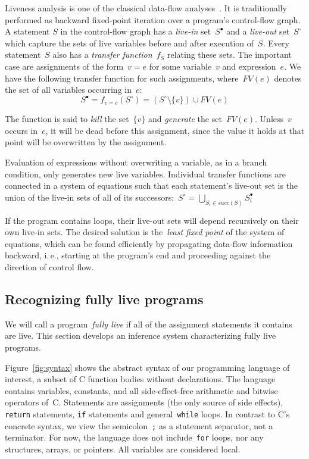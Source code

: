 \documentclass{llncs}
\newcommand{\liveout}[1]{\ensuremath{#1^{\circ}}}
\newcommand{\livein}[1]{\ensuremath{#1^{\bullet}}}
\def\union{\cup}
\begin{document}
Liveness analysis is one of the classical data-flow
analyses~\cite{nielson.etal-1999}. It is traditionally performed as backward
fixed-point iteration over a program's control-flow graph. A statement \(S\)
in the control-flow graph has a \emph{live-in} set~\(\livein{S}\) and a
\emph{live-out} set~\(\liveout{S}\) which capture the sets of live variables
before and after execution of~\(S\). Every statement~\(S\) also has a
\emph{transfer function}~\(f_S\) relating these sets. The important case are
assignments of the form~\(v = e\) for some variable~\(v\) and
expression~\(e\). We have the following transfer function for such
assignments, where~\(FV(e)\) denotes the set of all variables occurring
in~\(e\):
\[
\livein{S} = f_{v = e}(\liveout{S})
           = (\liveout{S} \setminus \{v\}) \union FV(e)
\]

The function is said to \emph{kill} the set~\(\{v\}\) and \emph{generate}
the set~\(FV(e)\). Unless~\(v\) occurs in~\(e\), it will be dead before this
assignment, since the value it holds at that point will be overwritten by
the assignment.

Evaluation of expressions without overwriting a variable,
as in a branch condition, only generates new live variables. Individual
transfer functions are connected in a system of equations such that each
statement's live-out set is the union of the live-in sets of all of its
successors:~\(\liveout{S} = \bigcup_{S_i \in \mathit{succ}(S)}
\livein{S_i}\)

If the program contains loops, their live-out sets will depend recursively
on their own live-in sets. The desired solution is the~\emph{least fixed
point} of the system of equations, which can be found efficiently by
propagating data-flow information backward, i.\,e., starting at the
program's end and proceeding against the direction of control flow.


\subsection{Recognizing fully live programs}

We will call a program~\emph{fully live} if all of the assignment statements
it contains are live. This section develops an inference system
characterizing fully live programs.

Figure~\ref{fig:syntax} shows the abstract syntax of our programming
language of interest, a subset of C function bodies without declarations.
The language contains variables, constants, and all side-effect-free
arithmetic and bitwise operators of~C. Statements are assignments (the only
source of side effects), \verb|return| statements, \verb|if| statements and
general~\verb|while| loops. In contrast to C's concrete syntax, we view the
semicolon~\verb|;| as a statement separator, not a terminator. For now, the
language does not include~\verb|for| loops, nor any structures, arrays, or
pointers. All variables are considered local.
\end{document}

